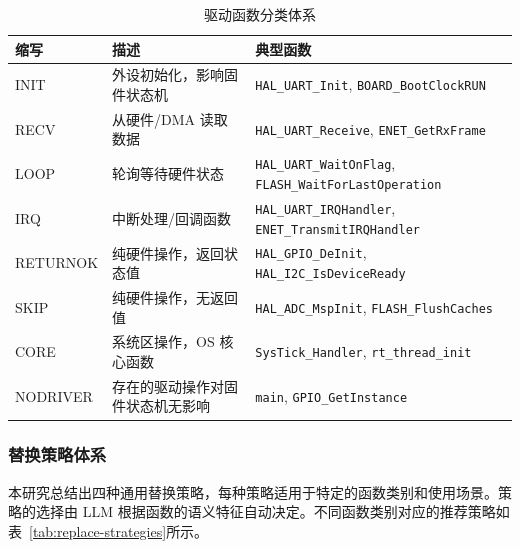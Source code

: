 \begin{table}[!htbp]
\centering
\caption{驱动函数分类体系}
\label{tab:function-categories}
\small
\setlength{\tabcolsep}{4pt}
\begin{tabular}{@{}llp{6.6cm}@{}}
\toprule
\textbf{缩写} & \textbf{描述} & \textbf{典型函数} \\
\midrule
INIT & 外设初始化，影响固件状态机 & \texttt{HAL\_UART\_Init}, \texttt{BOARD\_BootClockRUN} \\
RECV & 从硬件/DMA 读取数据 & \texttt{HAL\_UART\_Receive}, \texttt{ENET\_GetRxFrame} \\
LOOP & 轮询等待硬件状态 & \texttt{HAL\_UART\_WaitOnFlag}, \texttt{FLASH\_WaitForLastOperation} \\
IRQ & 中断处理/回调函数 & \texttt{HAL\_UART\_IRQHandler}, \texttt{ENET\_TransmitIRQHandler} \\
RETURNOK & 纯硬件操作，返回状态值 & \texttt{HAL\_GPIO\_DeInit}, \texttt{HAL\_I2C\_IsDeviceReady} \\
SKIP & 纯硬件操作，无返回值 & \texttt{HAL\_ADC\_MspInit}, \texttt{FLASH\_FlushCaches} \\
\midrule
CORE & 系统区操作，OS 核心函数 & \texttt{SysTick\_Handler}, \texttt{rt\_thread\_init} \\
NODRIVER & 存在的驱动操作对固件状态机无影响 & \texttt{main}, \texttt{GPIO\_GetInstance} \\
\bottomrule
\end{tabular}
\end{table}

\subsubsection{替换策略体系}

本研究总结出四种通用替换策略，每种策略适用于特定的函数类别和使用场景。策略的选择由 LLM 根据函数的语义特征自动决定。不同函数类别对应的推荐策略如表~\ref{tab:replace-strategies}所示。

